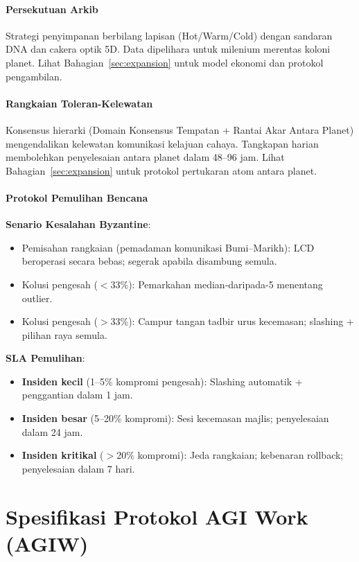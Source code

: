 \documentclass[11pt]{article}
\begin{document}
\paragraph{Persekutuan Arkib}
Strategi penyimpanan berbilang lapisan (Hot/Warm/Cold) dengan sandaran DNA dan cakera optik 5D. Data dipelihara untuk milenium merentas koloni planet. Lihat Bahagian~\ref{sec:expansion} untuk model ekonomi dan protokol pengambilan.

\paragraph{Rangkaian Toleran-Kelewatan}
Konsensus hierarki (Domain Konsensus Tempatan + Rantai Akar Antara Planet) mengendalikan kelewatan komunikasi kelajuan cahaya. Tangkapan harian membolehkan penyelesaian antara planet dalam 48--96 jam. Lihat Bahagian~\ref{sec:expansion} untuk protokol pertukaran atom antara planet.

\paragraph{Protokol Pemulihan Bencana}
\textbf{Senario Kesalahan Byzantine}:
\begin{itemize}[noitemsep]
  \item Pemisahan rangkaian (pemadaman komunikasi Bumi--Marikh): LCD beroperasi secara bebas; segerak apabila disambung semula.
  \item Kolusi pengesah ($<$33\%): Pemarkahan median-daripada-5 menentang outlier.
  \item Kolusi pengesah ($>$33\%): Campur tangan tadbir urus kecemasan; slashing + pilihan raya semula.
\end{itemize}

\textbf{SLA Pemulihan}:
\begin{itemize}[noitemsep]
  \item \textbf{Insiden kecil} (1--5\% kompromi pengesah): Slashing automatik + penggantian dalam 1 jam.
  \item \textbf{Insiden besar} (5--20\% kompromi): Sesi kecemasan majlis; penyelesaian dalam 24 jam.
  \item \textbf{Insiden kritikal} ($>$20\% kompromi): Jeda rangkaian; kebenaran rollback; penyelesaian dalam 7 hari.
\end{itemize}

\section{Spesifikasi Protokol AGI Work (AGIW)}
\label{sec:agiw-spec}
\end{document}
